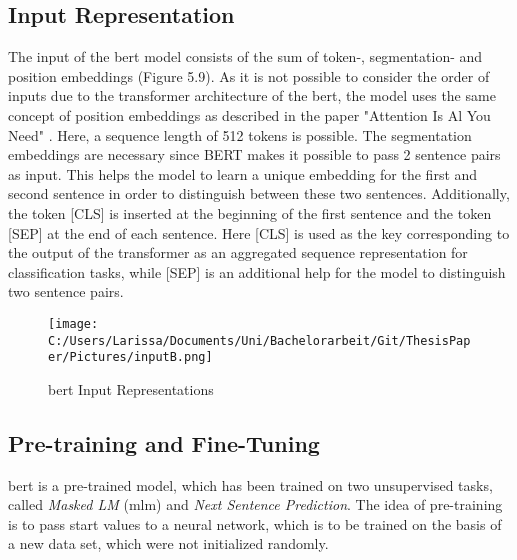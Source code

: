 \documentclass[a4paper, 11pt,titlepage,oneside,openany]{book}
\begin{document}
\subsection{Input Representation}
The input of the \gls{bert} model consists of the sum of token-, segmentation- and position embeddings (Figure 5.9). As it is not possible to consider the order of inputs due to the transformer architecture of the \gls{bert}, the model uses the same concept of position embeddings as described in the paper "Attention Is Al You Need" \cite{attention}. Here, a sequence length of 512 tokens is possible. The segmentation embeddings are necessary since BERT makes it possible to pass 2 sentence pairs as input. This helps the model to learn a unique embedding for the first and second sentence in order to distinguish between these two sentences.  Additionally, the token [CLS] is inserted at the beginning of the first sentence and the token [SEP] at the end of each sentence. Here [CLS] is used as the key corresponding to the output of the transformer as an aggregated sequence representation for classification tasks, while [SEP] is an additional help for the model to distinguish two sentence pairs.
\begin{figure}[t]
	\centering
	\texttt{[image: C:/Users/Larissa/Documents/Uni/Bachelorarbeit/Git/ThesisPaper/Pictures/inputB.png]}
	\caption{\gls{bert} Input Representations \cite{bert}}
	
\end{figure}

\subsection{Pre-training and Fine-Tuning}
\gls{bert} is a pre-trained model, which has been trained on two unsupervised tasks, called \textit{Masked LM} (\gls{mlm}) and \textit{Next Sentence Prediction}. The idea of pre-training is to pass start values to a neural network, which is to be trained on the basis of a new data set, which were not initialized randomly. \\
\end{document}
